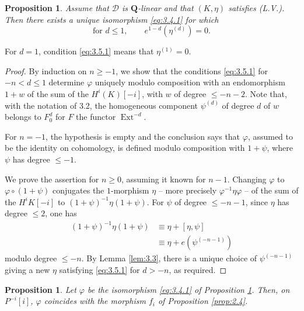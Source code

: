 \documentclass[11pt,a4paper]{article}
\theoremstyle{plain}
\newtheorem{proposition}[theorem]{Proposition}
\theoremstyle{definition}
\theoremstyle{remark}
\DeclareMathOperator{\Ext}{Ext}
\newcommand{\cD}{\mathscr{D}}
\newcommand{\bQ}{\mathbf{Q}}
\begin{document}
\begin{proposition}\label{prop:3.5}
Assume that $\cD$ is $\bQ$-linear and that $(K,\eta)$ satisfies (L.V.). Then there exists a unique isomorphism \eqref{eq:3.4.1} for which
\begin{equation}\label{eq:3.5.1}
\text{for }d\leqslant1,\qquad e^{1-d}(\eta^{(d)})=0.
\end{equation}
\end{proposition}

For $d=1$, condition \eqref{eq:3.5.1} means that $\eta^{(1)}=0$.

\begin{proof}
By induction on $n\geqslant-1$, we show that the conditions \eqref{eq:3.5.1} for $-n<d\leqslant1$ determine $\varphi$ uniquely modulo composition with an endomorphism $1+w$ of the sum of the $H^i(K)[-i]$, with $w$ of degree $\leqslant -n-2$. Note that, with the notation of 3.2, the homogeneous component $\psi^{(d)}$ of degree $d$ of $w$ belongs to $F_0^d$ for $F$ the functor $\Ext^{-d}$.

For $n=-1$, the hypothesis is empty and the conclusion says that $\varphi$, assumed to be the identity on cohomology, is defined modulo composition with $1+\psi$, where $\psi$ has degree $\leqslant -1$.

We prove the assertion for $n\geqslant0$, assuming it known for $n-1$. Changing $\varphi$ to $\varphi\circ(1+\psi)$ conjugates the $1$-morphism $\eta$ -- more precisely $\varphi^{-1}\eta\varphi$ -- of the sum of the $H^iK[-i]$ to $(1+\psi)^{-1}\eta(1+\psi)$. For $\psi$ of degree $\leqslant -n-1$, since $\eta$ has degree $\leqslant2$, one has
\begin{align*}
(1+\psi)^{-1}\eta(1+\psi)&\equiv \eta+[\eta,\psi]\\
&\equiv \eta+e(\psi^{(-n-1)})
\end{align*}
modulo degree $\leqslant -n$. By Lemma \ref{lem:3.3}, there is a unique choice of $\psi^{(-n-1)}$ giving a new $\eta$ satisfying \eqref{eq:3.5.1} for $d>-n$, as required.
\end{proof}

\begin{proposition}\label{prop:3.6}
Let $\varphi$ be the isomorphism \eqref{eq:3.4.1} of Proposition \ref{prop:3.5}. Then, on $P^{-i}[i]$, $\varphi$ coincides with the morphism $f_i$ of Proposition \ref{prop:2.4}.
\end{proposition}
\end{document}
